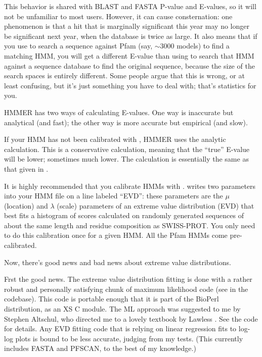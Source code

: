 This behavior is shared with BLAST and FASTA P-value and E-values, so
it will not be unfamiliar to most users. However, it can cause
consternation: one phenomenon is that a hit that is marginally
significant this year may no longer be significant next year, when the
database is twice as large. It also means that if you use
 to search a
sequence against Pfam (say, $\sim 3000$ models) to find a matching
HMM, you will get a different E-value than using
 to search that HMM against
a sequence database to find the original sequence, because the size of
the search spaces is entirely different. Some people argue that this
is wrong, or at least confusing, but it's just something you have to
deal with; that's statistics for you.

HMMER has two ways of calculating E-values. One way is inaccurate but
analytical (and fast); the other way is more accurate but empirical
(and slow).

If your HMM has not been calibrated with , HMMER
uses the analytic calculation. This is a conservative calculation,
meaning that the ``true'' E-value will be lower; sometimes much lower.
The calculation is essentially the same as that given in
\cite{Barrett97}.

It is highly recommended that you calibrate HMMs with
.  writes two parameters
into your HMM file on a line labeled ``EVD'': these parameters are the
$\mu$ (location) and $\lambda$ (scale) parameters of an extreme value
distribution (EVD) that best fits a histogram of scores calculated on
randomly generated sequences of about the same length and residue
composition as SWISS-PROT. You only need to do this calibration once
for a given HMM. All the Pfam HMMs come pre-calibrated.

Now, there's good news and bad news about extreme value distributions.

Frst the good news. The extreme value distribution fitting is done
with a rather robust and personally satisfying chunk of maximum
likelihood code (see  in the codebase). This code is
portable enough that it is part of the BioPerl distribution, as an XS
C module. The ML approach was suggested to me by Stephen Altschul, who
directed me to a lovely textbook by Lawless \cite{Lawless82}. See the
code for details. Any EVD fitting code that is relying on linear
regression fits to log-log plots is bound to be less accurate, judging
from my tests. (This currently includes FASTA and PFSCAN, to the best
of my knowledge.)

